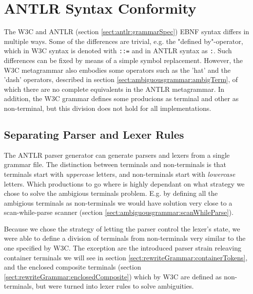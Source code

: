 \section{ANTLR Syntax Conformity}
The W3C\cite{w3c00} and ANTLR (section \ref{sect:antlr:grammarSpec}) EBNF syntax differs in multiple ways. Some of the differences are trivial, e.g. the "defined by"-operator, which in W3C syntax is denoted with \verb!::=! and in ANTLR syntax as \verb!:!. Such differences can be fixed by means of a simple symbol replacement. However, the W3C metagrammar also embodies some operators such as the 'hat' and the 'dash' operators, described in section \ref{sect:ambiguousgrammar:ambigTerm}, of which there are no complete equivalents in the ANTLR metagrammar. In addition, the W3C grammar defines some producions as terminal and other as non-terminal, but this division does not hold for all implementations.

\subsection{Separating Parser and Lexer Rules}
\label{sect:implementation:separate}
The ANTLR parser generator can generate parsers and lexers from a single grammar file. The distinction between terminals and non-terminals is that terminals start with \emph{uppercase} letters, and non-terminals start with \emph{lowercase} letters. Which productions to go where is highly dependant on what strategy we chose to solve the ambigious terminals problem. E.g. by defining all the ambigious terminals as non-terminals we would have solution very close to a scan-while-parse scanner (section \ref{sect:ambiguousgrammar:scanWhileParse}). 

Because we chose the strategy of letting the parser control the lexer's state, we were able to define a division of terminals from non-terminals very similar to the one specified by W3C. The exception are the introduced parser strain releaving container terminals we will see in section \ref{sect:rewriteGrammar:containerTokens}, and the enclosed composite terminals (section \ref{sect:rewriteGrammar:enclosedComposite}) which by W3C are defined as non-terminals, but were turned into lexer rules to solve ambiguities.

